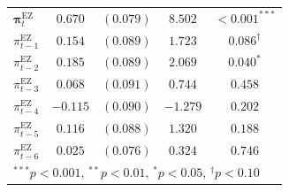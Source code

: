 \begin{table}[H]
{\begin{tabular*}{\textwidth}{@{\extracolsep{\fill}}lcccc}
$\pmb{\pi}^{\text{EZ}}_{t}$           & $\mathbf{0.670}$ & $\mathbf{(0.079)}$ & $\mathbf{8.502}$ & $\mathbf{{<}0.001^{***}}$ \\[2pt]
$\pi^{\text{EZ}}_{t-1}$                  & $0.154$ & $(0.089)$ & $1.723$ & $0.086^{\dagger}$ \\[2pt]
$\pi^{\text{EZ}}_{t-2}$                  & $0.185$ & $(0.089)$ & $2.069$ & $0.040^{*}$ \\[2pt]
$ \pi^{\text{EZ}}_{t-3}$                  & $0.068$ & $(0.091)$ & $0.744$ & $0.458$ \\[2pt]
$ \pi^{\text{EZ}}_{t-4}$                  & $-0.115$ & $(0.090)$ & $-1.279$ & $0.202$ \\[2pt]
$ \pi^{\text{EZ}}_{t-5}$                  & $0.116$ & $(0.088)$ & $1.320$ & $0.188$ \\[2pt]
$ \pi^{\text{EZ}}_{t-6}$                 & $0.025$ & $(0.076)$ & $0.324$ & $0.746$ \\[4pt]
\hline \hline
\multicolumn{5}{l}{\footnotesize $^{***}p<0.001$,\; $^{**}p<0.01$,\; $^{*}p<0.05$,\; $^{\dagger}p<0.10$}
\end{tabular*}
}
\label{tab:gum_coef}
\end{table}